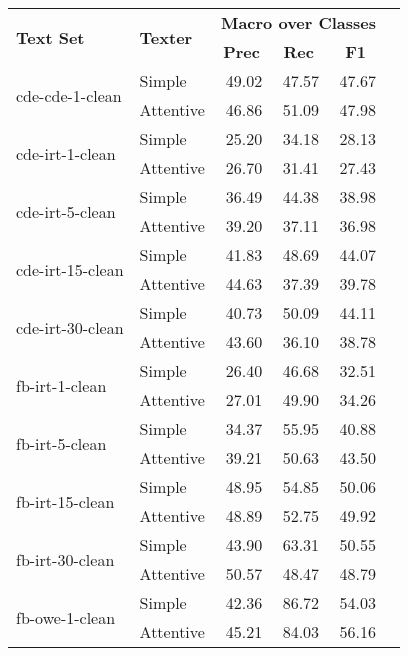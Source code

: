 \begin{tabular}{| l | l | r | r | r | r |}
    \hline

    \multirow{2}{*}{\textbf{Text Set}} &
    \multirow{2}{*}{\textbf{Texter}} &
    \multicolumn{3}{|c|}{\textbf{Macro over Classes}} \\

    & &
    \multicolumn{1}{|c|}{\textbf{Prec}} &
    \multicolumn{1}{|c|}{\textbf{Rec}} &
    \multicolumn{1}{|c|}{\textbf{F1}} \\ \hline \hline

    \multirow{2}{*}{cde-cde-1-clean}
    & Simple    & 49.02 & 47.57 & 47.67 \\
    & Attentive & 46.86 & 51.09 & 47.98 \\ \hline

    \multirow{2}{*}{cde-irt-1-clean}
    & Simple    & 25.20 & 34.18 & 28.13 \\
    & Attentive & 26.70 & 31.41 & 27.43 \\ \hline

    \multirow{2}{*}{cde-irt-5-clean}
    & Simple    & 36.49 & 44.38 & 38.98 \\
    & Attentive & 39.20 & 37.11 & 36.98 \\ \hline

    \multirow{2}{*}{cde-irt-15-clean}
    & Simple    & 41.83 & 48.69 & 44.07 \\
    & Attentive & 44.63 & 37.39 & 39.78 \\ \hline

    \multirow{2}{*}{cde-irt-30-clean}
    & Simple    & 40.73 & 50.09 & 44.11 \\
    & Attentive & 43.60 & 36.10 & 38.78 \\ \hline \hline

    \multirow{2}{*}{fb-irt-1-clean}
    & Simple    & 26.40 & 46.68 & 32.51 \\
    & Attentive & 27.01 & 49.90 & 34.26 \\ \hline

    \multirow{2}{*}{fb-irt-5-clean}
    & Simple    & 34.37 & 55.95 & 40.88 \\
    & Attentive & 39.21 & 50.63 & 43.50 \\ \hline

    \multirow{2}{*}{fb-irt-15-clean}
    & Simple    & 48.95 & 54.85 & 50.06 \\
    & Attentive & 48.89 & 52.75 & 49.92 \\ \hline

    \multirow{2}{*}{fb-irt-30-clean}
    & Simple    & 43.90 & 63.31 & 50.55 \\
    & Attentive & 50.57 & 48.47 & 48.79 \\ \hline

    \multirow{2}{*}{fb-owe-1-clean}
    & Simple    & 42.36 & 86.72 & 54.03 \\
    & Attentive & 45.21 & 84.03 & 56.16 \\ \hline
\end{tabular}
